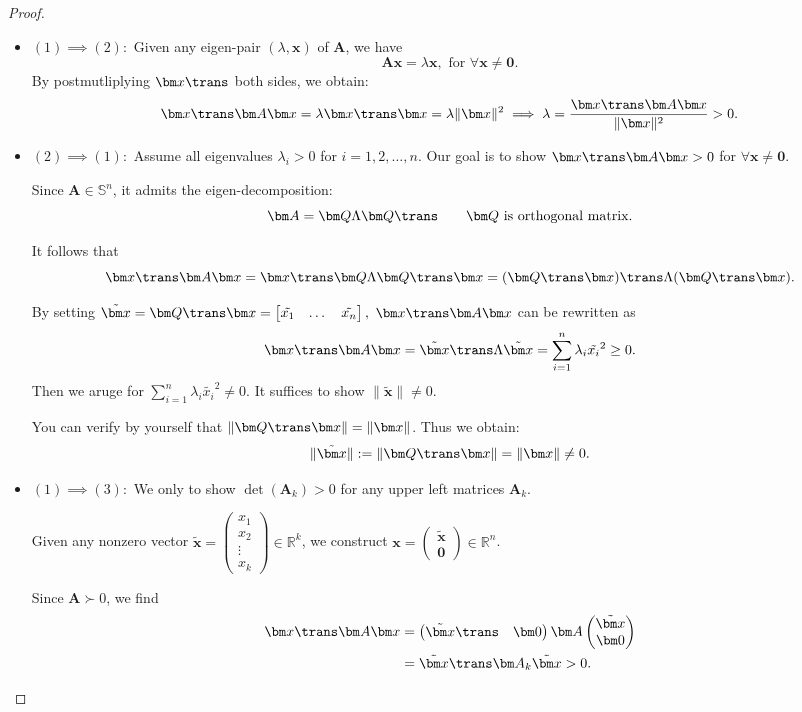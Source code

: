 \begin{proof}
\begin{itemize}
\item
$(1)\implies(2):$ Given any eigen-pair $(\lambda,\bm x)$ of $\bm A$, we have
\[
\bm{Ax}=\lambda\bm x,\text{ for }\forall\bm x\ne\bm0.
\]
By postmutliplying $\bm x\trans$ both sides, we obtain:
\[
\bm x\trans\bm A\bm x=\lambda\bm x\trans\bm x=\lambda\|\bm x\|^2
\implies
\lambda=\frac{\bm x\trans\bm A\bm x}{\|\bm x\|^2}>0.
\]
\item
$(2)\implies(1):$ Assume all eigenvalues $\lambda_i>0$ for $i=1,2,\dots,n.$ Our goal is to show $\bm x\trans\bm A\bm x>0$ for $\forall\bm x\ne\bm 0$.

Since $\bm A\in\mathbb{S}^n$, it admits the eigen-decomposition:
\[
\bm A=\bm Q\Lambda\bm Q\trans\qquad\text{$\bm Q$ is orthogonal matrix.}
\]

It follows that 
\[
\bm x\trans\bm A\bm x=\bm x\trans\bm Q\Lambda\bm Q\trans\bm x=(\bm Q\trans\bm x)\trans\Lambda(\bm Q\trans\bm x).
\]

By setting $\tilde{\bm x}=\bm Q\trans\bm x=\begin{bmatrix}
\tilde{x_1}&\dots&\tilde{x_n}
\end{bmatrix},$ $\bm x\trans\bm A\bm x$ can be rewritten as
\[
\bm x\trans\bm A\bm x=\tilde{\bm x}\trans\Lambda\tilde{\bm x}=\sum_{i=1}^{n}\lambda_i\tilde{x_i}^2\ge0.
\]
Then we aruge for $\sum_{i=1}^{n}\lambda_i\tilde{x_i}^2\ne0.$ It suffices to show $\|\tilde{\bm x}\|\ne0$.

You can verify by yourself that $\|\bm Q\trans\bm x\|=\|\bm x\|$. Thus we obtain:
\[
\|\tilde{\bm x}\|:=\|\bm Q\trans\bm x\|=\|\bm x\|\ne0.
\]
\item
$(1)\implies(3):$ We only to show $\det(\bm A_k)>0$ for any upper left matrices $\bm A_k$.

Given any nonzero vector $\tilde{\bm x}=\begin{pmatrix}
x_1\\x_2\\\vdots\\x_k
\end{pmatrix}\in\mathbb{R}^{k}$, we construct $\bm x=\begin{pmatrix}
\tilde{\bm x}\\\bm 0
\end{pmatrix}\in\mathbb{R}^{n}$.

Since $\bm A\succ0$, we find
\begin{align*}
\bm x\trans\bm A\bm x&=\begin{pmatrix}
\tilde{\bm x}\trans&\bm 0
\end{pmatrix}\bm A\begin{pmatrix}
\tilde{\bm x}\\\bm 0
\end{pmatrix}\\
&=\tilde{\bm x}\trans\bm A_k\tilde{\bm x}>0.
\end{align*}


\end{itemize}
\end{proof}
